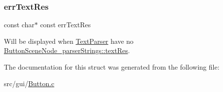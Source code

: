 \subsubsection{\texorpdfstring{err\+Text\+Res}{errTextRes}}
{\footnotesize\ttfamily const char$\ast$ const err\+Text\+Res}

Will be displayed when \hyperlink{struct_text_parser}{Text\+Parser} have no \hyperlink{struct_button_scene_node__parser_strings_ab8666a8039b6fdab629c3e0853421c3c}{Button\+Scene\+Node\+\_\+parser\+Strings\+::text\+Res}. 

The documentation for this struct was generated from the following file\+:\begin{DoxyCompactItemize}
\item 
src/gui/\hyperlink{_button_8c}{Button.\+c}\end{DoxyCompactItemize}
